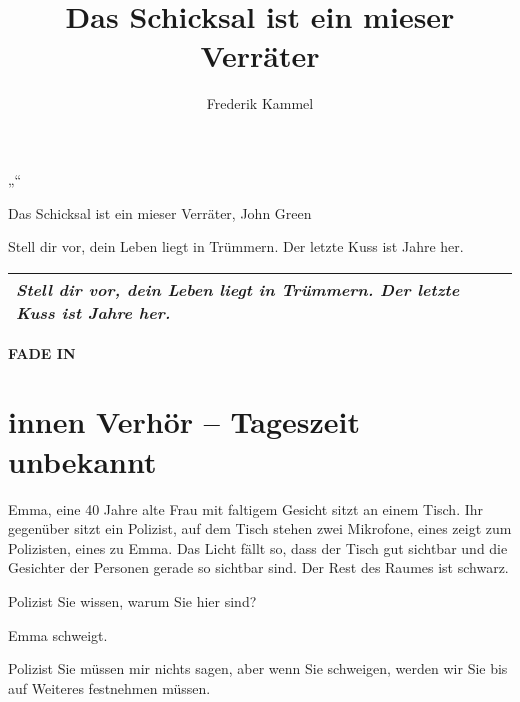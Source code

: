 \documentclass[12pt]{article}
\title{Das Schicksal ist ein mieser Verräter}
\author{Frederik Kammel}
\newenvironment{scene}[4][\unskip]{
    \textbf{\uppercase{#1}}


    \section{#2 #3 -- #4}\label{sec:scene-#3}
    }{}
\newenvironment{scenedescription}{%
    \begin{flushleft}
    }{
    \end{flushleft}
}
\newcommand{\actionline}[1]{#1}
\newcommand{\BasedOn}{Das Schicksal ist ein mieser Verräter, John Green}
\newcommand{\TitleSlug}{Stell dir vor, dein Leben liegt in Trümmern. \newline Der letzte Kuss ist Jahre her.}
\begin{document}
    \selectfont

    \begin{titlepage}
        \centering
        „\MakeUppercase{\thetitle}“

        \vspace{2cm}
        \translationWrittenBy

        \theauthor

        \vspace{2cm}
        \translationBasedOn

        \BasedOn

        \ifdefined\TitleSlug
        \vspace{2cm}

        \begin{adjustwidth}{1cm}{1cm}
            \begin{center}
                \begin{tabular}{ P{13cm} }
                    \hline
                    \textit{\TitleSlug} \\
                    \hline
                \end{tabular}
            \end{center}
        \end{adjustwidth}
        \fi
    \end{titlepage}


    \begin{scene}[fade in]{innen}{Verhör}{Tageszeit unbekannt}
        \begin{scenedescription}
            \gls{Emma}, eine 40 Jahre alte Frau mit faltigem Gesicht sitzt an einem Tisch.
            Ihr gegenüber sitzt ein \gls{Polizist}, auf dem Tisch stehen zwei Mikrofone, eines zeigt zum \gls{Polizist}en, eines zu Emma.
            Das Licht fällt so, dass der Tisch gut sichtbar und die Gesichter der Personen gerade so sichtbar sind.
            Der Rest des Raumes ist schwarz.
        \end{scenedescription}

        \begin{dialog}{Polizist}
            Sie wissen, warum Sie hier sind?
        \end{dialog}

        \actionline{\gls{Emma} schweigt.}

        \begin{dialog}[Fortsetzung]{Polizist}
            Sie müssen mir nichts sagen, aber wenn Sie schweigen, werden wir Sie bis auf Weiteres festnehmen müssen.
        \end{dialog}
    \end{scene}
\end{document}
